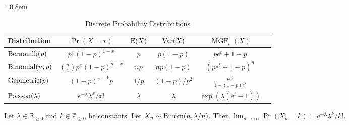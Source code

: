 \documentclass[a4paper, 12pt, fleqn]{article}
\DeclareMathOperator{\MGF}{MGF}
\begin{document}
\begin{table}[!ht]
\centering
\caption{Discrete Probability Distributions}
=0.8em
\abovetopsep=4pt
\begin{tabular}{lccccc}
\toprule Distribution
    & $\Pr(X = x)$
    & $\operatorname*{E}(X)$
    & $\operatorname*{Var}(X)$
    & $\MGF_t(X)$
\\ \midrule $\operatorname{Bernouilli}(p)$
    & $p^x(1-p)^{1-x}$
    & $p$
    & $p(1-p)$
    & $pe^t + 1-p$
\\[\defaultaddspace] $\operatorname{Binomial}(n, p)$
    & $\displaystyle \binom{n}{x}p^x(1-p)^{n-x}$
    & $np$
    & $np(1-p)$
    & $(pe^t + 1-p)^n$
\\[\defaultaddspace] $\operatorname{Geometric}(p)$
    & $(1-p)^{x-1}p$
    & $1/p$
    & $(1-p)/p^2$
    & $\displaystyle \frac{pe^t}{1-(1-p)e^t}$
\\[\defaultaddspace] $\operatorname{Poisson}(\lambda)$
    & $e^{-\lambda}\lambda^x/x!$
    & $\lambda$
    & $\lambda$
    & $\displaystyle \exp(\lambda(e^t-1))$
\\ \bottomrule
\end{tabular}
\label{table:disc-distr}
\end{table}

\begin{theorem}
Let $\lambda \in \mathbb{R}_{\ge 0}$ and $k \in \mathbb{Z}_{\ge 0}$ be constants.
Let $X_n \sim \operatorname{Binom}(n, \lambda/n)$.
Then $\lim_{n \to \infty} \Pr(X_n = k) = e^{-\lambda}\lambda^k/k!$.
\end{theorem}
\end{document}
